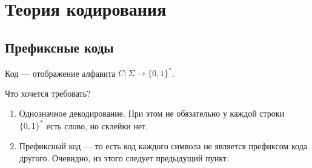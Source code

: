 \chapter{Теория кодирования}
\section{Префиксные коды}
Код --- отображение алфавита $ C \colon \Sigma \to \{0, 1\}^{*}$.

Что хочется требовать?
\begin{enumerate}
    \item Однозначное декодирование. При этом не обязательно у каждой строки $ \{0, 1\}^{*}$ есть слово, но склейки нет.
	\item Префиксный код --- то есть код каждого символа не является префиксом кода другого. Очевидно, из этого следует предыдущий пункт.
\end{enumerate} 

